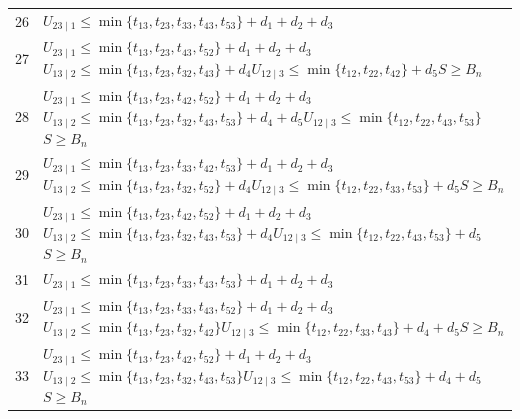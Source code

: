 \documentclass[a4paper,11pt]{amsart}
\numberwithin{equation}{section}
\theoremstyle{definition}
\theoremstyle{remark}
\begin{document}
{\begin{longtable}{@{}r>{\raggedright\arraybackslash}p{12.9cm}@{}}
26 & \(U_{23\mid 1}\leq \min\{t_{13},t_{23},t_{33},t_{43},t_{53}\}+d_{1}+d_{2}+d_{3}\)\\[3pt]
27 & \(U_{23\mid 1}\leq \min\{t_{13},t_{23},t_{43},t_{52}\}+d_{1}+d_{2}+d_{3}\)\newline \(U_{13\mid 2}\leq \min\{t_{13},t_{23},t_{32},t_{43}\}+d_{4}\)\newline \(U_{12\mid 3}\leq \min\{t_{12},t_{22},t_{42}\}+d_{5}\)\newline \(S\geq B_n\)\\[3pt]
28 & \(U_{23\mid 1}\leq \min\{t_{13},t_{23},t_{42},t_{52}\}+d_{1}+d_{2}+d_{3}\)\newline \(U_{13\mid 2}\leq \min\{t_{13},t_{23},t_{32},t_{43},t_{53}\}+d_{4}+d_{5}\)\newline \(U_{12\mid 3}\leq \min\{t_{12},t_{22},t_{43},t_{53}\}\)\newline \(S\geq B_n\)\\[3pt]
29 & \(U_{23\mid 1}\leq \min\{t_{13},t_{23},t_{33},t_{42},t_{53}\}+d_{1}+d_{2}+d_{3}\)\newline \(U_{13\mid 2}\leq \min\{t_{13},t_{23},t_{32},t_{52}\}+d_{4}\)\newline \(U_{12\mid 3}\leq \min\{t_{12},t_{22},t_{33},t_{53}\}+d_{5}\)\newline \(S\geq B_n\)\\[3pt]
30 & \(U_{23\mid 1}\leq \min\{t_{13},t_{23},t_{42},t_{52}\}+d_{1}+d_{2}+d_{3}\)\newline \(U_{13\mid 2}\leq \min\{t_{13},t_{23},t_{32},t_{43},t_{53}\}+d_{4}\)\newline \(U_{12\mid 3}\leq \min\{t_{12},t_{22},t_{43},t_{53}\}+d_{5}\)\newline \(S\geq B_n\)\\[3pt]
31 & \(U_{23\mid 1}\leq \min\{t_{13},t_{23},t_{33},t_{43},t_{53}\}+d_{1}+d_{2}+d_{3}\)\\[3pt]
32 & \(U_{23\mid 1}\leq \min\{t_{13},t_{23},t_{33},t_{43},t_{52}\}+d_{1}+d_{2}+d_{3}\)\newline \(U_{13\mid 2}\leq \min\{t_{13},t_{23},t_{32},t_{42}\}\)\newline \(U_{12\mid 3}\leq \min\{t_{12},t_{22},t_{33},t_{43}\}+d_{4}+d_{5}\)\newline \(S\geq B_n\)\\[3pt]
33 & \(U_{23\mid 1}\leq \min\{t_{13},t_{23},t_{42},t_{52}\}+d_{1}+d_{2}+d_{3}\)\newline \(U_{13\mid 2}\leq \min\{t_{13},t_{23},t_{32},t_{43},t_{53}\}\)\newline \(U_{12\mid 3}\leq \min\{t_{12},t_{22},t_{43},t_{53}\}+d_{4}+d_{5}\)\newline \(S\geq B_n\)\\[3pt]

\end{longtable}}
\end{document}
